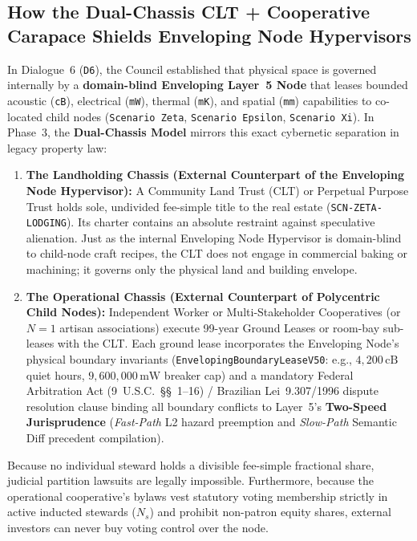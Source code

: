 \subsection{How the Dual-Chassis CLT + Cooperative Carapace Shields Enveloping Node Hypervisors}

In Dialogue~6 (\texttt{D6}), the Council established that physical space is governed internally by a \textbf{domain-blind Enveloping Layer~5 Node} that leases bounded acoustic (\texttt{cB}), electrical (\texttt{mW}), thermal (\texttt{mK}), and spatial (\texttt{mm}) capabilities to co-located child nodes (\texttt{Scenario Zeta}, \texttt{Scenario Epsilon}, \texttt{Scenario Xi}). In Phase~3, the \textbf{Dual-Chassis Model} mirrors this exact cybernetic separation in legacy property law:
\begin{enumerate}
    \item \textbf{The Landholding Chassis (External Counterpart of the Enveloping Node Hypervisor):} A Community Land Trust (CLT) or Perpetual Purpose Trust holds sole, undivided fee-simple title to the real estate (\texttt{SCN-ZETA-LODGING}). Its charter contains an absolute restraint against speculative alienation. Just as the internal Enveloping Node Hypervisor is domain-blind to child-node craft recipes, the CLT does not engage in commercial baking or machining; it governs only the physical land and building envelope.
    \item \textbf{The Operational Chassis (External Counterpart of Polycentric Child Nodes):} Independent Worker or Multi-Stakeholder Cooperatives (or $N=1$ artisan associations) execute 99-year Ground Leases or room-bay sub-leases with the CLT. Each ground lease incorporates the Enveloping Node's physical boundary invariants (\texttt{EnvelopingBoundaryLeaseV50}: e.g., $4{,}200\,\mathrm{cB}$ quiet hours, $9{,}600{,}000\,\mathrm{mW}$ breaker cap) and a mandatory Federal Arbitration Act (9~U.S.C.~\S\S~1--16) / Brazilian Lei~9.307/1996 dispute resolution clause binding all boundary conflicts to Layer~5's \textbf{Two-Speed Jurisprudence} (\textit{Fast-Path} L2 hazard preemption and \textit{Slow-Path} Semantic Diff precedent compilation).
\end{enumerate}

Because no individual steward holds a divisible fee-simple fractional share, judicial partition lawsuits are legally impossible. Furthermore, because the operational cooperative's bylaws vest statutory voting membership strictly in active inducted stewards ($N_s$) and prohibit non-patron equity shares, external investors can never buy voting control over the node.

